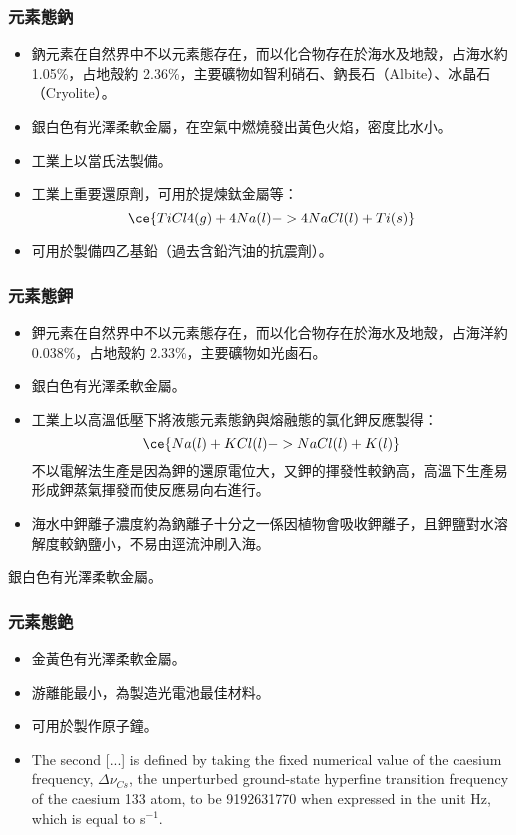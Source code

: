 \documentclass[a4paper,12pt]{report}
\begin{document}
\begin{itemize}
\begin{itemize}
\subsubsection{元素態鈉}
\begin{itemize}
\item 鈉元素在自然界中不以元素態存在，而以化合物存在於海水及地殼，占海水約 1.05\%，占地殼約 2.36\%，主要礦物如智利硝石、鈉長石（Albite）、冰晶石（Cryolite）。
\item 銀白色有光澤柔軟金屬，在空氣中燃燒發出黃色火焰，密度比水小。
\item 工業上以當氏法製備。
\item 工業上重要還原劑，可用於提煉鈦金屬等：
\[\ce{TiCl4(g) + 4Na(l) -> 4NaCl(l) + Ti(s)}\]
\item 可用於製備四乙基鉛（過去含鉛汽油的抗震劑）。
\end{itemize}
\subsubsection{元素態鉀}
\begin{itemize}
\item 鉀元素在自然界中不以元素態存在，而以化合物存在於海水及地殼，占海洋約 0.038\%，占地殼約 2.33\%，主要礦物如光鹵石。
\item 銀白色有光澤柔軟金屬。
\item 工業上以高溫低壓下將液態元素態鈉與熔融態的氯化鉀反應製得：
\[\ce{Na(l) + KCl(l) -> NaCl(l) + K(l)}\]
不以電解法生產是因為鉀的還原電位大，又鉀的揮發性較鈉高，高溫下生產易形成鉀蒸氣揮發而使反應易向右進行。
\item 海水中鉀離子濃度約為鈉離子十分之一係因植物會吸收鉀離子，且鉀鹽對水溶解度較鈉鹽小，不易由逕流沖刷入海。
\end{itemize}
銀白色有光澤柔軟金屬。
\subsubsection{元素態銫}
\begin{itemize}
\item 金黃色有光澤柔軟金屬。
\item 游離能最小，為製造光電池最佳材料。
\item 可用於製作原子鐘。
\item The second [...] is defined by taking the fixed numerical value of the caesium frequency, $\Delta\nu_{Cs}$, the unperturbed ground-state hyperfine transition frequency of the caesium 133 atom, to be 9192631770 when expressed in the unit Hz, which is equal to s$^{-1}$.
\end{itemize}

\end{itemize}
\end{itemize}
\end{document}
